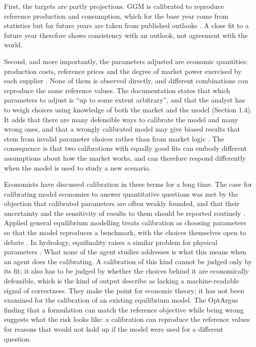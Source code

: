 First, the targets are partly projections.
GGM is calibrated to reproduce reference production and consumption, which for the base year come from statistics but for future years are taken from published outlooks \citep[p.~26]{egging2019global}.
A close fit to a future year therefore shows consistency with an outlook, not agreement with the world.

Second, and more importantly, the parameters adjusted are economic quantities: production costs, reference prices and the degree of market power exercised by each supplier \citep[p.~26]{egging2019global}.
None of them is observed directly, and different combinations can reproduce the same reference values.
The documentation states that which parameters to adjust is ``up to some extent arbitrary'', and that the analyst has to weigh choices using knowledge of both the market and the model (Section 1.4).
It adds that there are many defensible ways to calibrate the model and many wrong ones, and that a wrongly calibrated model may give biased results that stem from invalid parameter choices rather than from market logic \citep[p.~26]{egging2019global}.
The consequence is that two calibrations with equally good fits can embody different assumptions about how the market works, and can therefore respond differently when the model is used to study a new scenario.

Economists have discussed calibration in these terms for a long time.
The case for calibrating model economies to answer quantitative questions \citep{kydland1996computational} was met by the objection that calibrated parameters are often weakly founded, and that their uncertainty and the sensitivity of results to them should be reported routinely \citep{hansen1996empirical}.
Applied general equilibrium modelling treats calibration as choosing parameters so that the model reproduces a benchmark, with the choices themselves open to debate \citep{dawkins2001calibration}.
In hydrology, equifinality raises a similar problem for physical parameters \citep{beven2006manifesto}.
What none of the agent studies addresses is what this means when an agent does the calibrating.
A calibration of this kind cannot be judged only by its fit; it also has to be judged by whether the choices behind it are economically defensible, which is the kind of output \citet{zhu2026pai} describe as lacking a machine-readable signal of correctness.
They make the point for economic theory; it has not been examined for the calibration of an existing equilibrium model.
The OptArgus finding that a formulation can match the reference objective while being wrong \citep{li2026optargus} suggests what the risk looks like: a calibration can reproduce the reference values for reasons that would not hold up if the model were used for a different question.

